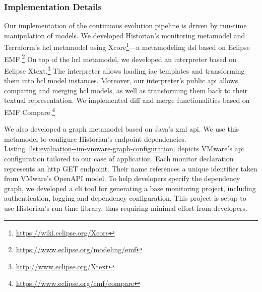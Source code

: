 \subsubsection{Implementation Details}
\label{subsubsect:evaluation--im-implementation-details}

Our implementation of the continuous evolution pipeline is driven by run-time manipulation of models. We developed Historian's monitoring metamodel and Terraform's \gls{hcl} metamodel using Xcore\footnote{\url{https://wiki.eclipse.org/Xcore}}---a metamodeling \gls{dsl} based on Eclipse EMF.\footnote{\url{https://www.eclipse.org/modeling/emf}} On top of the \gls{hcl} metamodel, we developed an interpreter based on Eclipse Xtext.\footnote{\url{http://www.eclipse.org/Xtext}} The interpreter allows loading \gls{iac} templates and transforming them into \gls{hcl} model instances. Moreover, our interpreter's public \gls{api} allows comparing and merging \gls{hcl} models, as well as transforming them back to their textual representation. We implemented diff and merge functionalities based on EMF Compare.\footnote{\url{https://www.eclipse.org/emf/compare}}

We also developed a graph metamodel based on Java's \acrshort{xml} \gls{api}. We use this metamodel to configure Historian's endpoint dependencies. Listing~\ref{lst:evaluation--im-vmware-graph-configuration} depicts VMware's \gls{api} configuration tailored to our case of application. Each monitor declaration represents an \gls{http} GET endpoint. Their name references a unique identifier taken from VMware's OpenAPI model. To help developers specify the dependency graph, we developed a \gls{cli} tool for generating a base monitoring project, including authentication, logging and dependency configuration. This project is setup to use Historian's run-time library, thus requiring minimal effort from developers.

